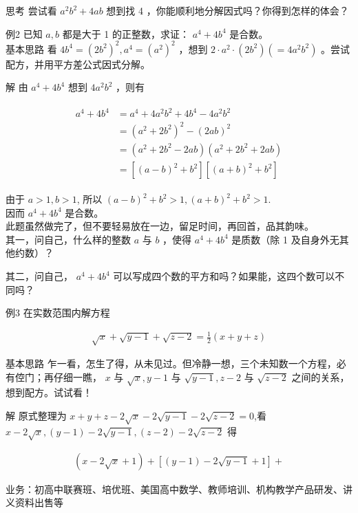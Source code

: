 \documentclass[10pt]{article}
\begin{document}
思考 尝试看 $a^{2} b^{2}+4 a b$ 想到找 4 ，你能顺利地分解因式吗？你得到怎样的体会？

例2 已知 $a, b$ 都是大于 1 的正整数，求证： $a^{4}+4 b^{4}$ 是合数。\\
基本思路 看 $4 b^{4}=\left(2 b^{2}\right)^{2}, a^{4}=\left(a^{2}\right)^{2}$ ，想到 $2 \cdot a^{2} \cdot\left(2 b^{2}\right)\left(=4 a^{2} b^{2}\right)$ 。尝试配方，并用平方差公式因式分解。

解 由 $a^{4}+4 b^{4}$ 想到 $4 a^{2} b^{2}$ ，则有

\begin{align*}
\begin{aligned}
a^{4}+4 b^{4} & =a^{4}+4 a^{2} b^{2}+4 b^{4}-4 a^{2} b^{2} \\
& =\left(a^{2}+2 b^{2}\right)^{2}-(2 a b)^{2} \\
& =\left(a^{2}+2 b^{2}-2 a b\right)\left(a^{2}+2 b^{2}+2 a b\right) \\
& =\left[(a-b)^{2}+b^{2}\right]\left[(a+b)^{2}+b^{2}\right]
\end{aligned}
\end{align*}

由于 $a>1, b>1$, 所以 $(a-b)^{2}+b^{2}>1,(a+b)^{2}+b^{2}>1$.\\
因而 $a^{4}+4 b^{4}$ 是合数。\\
此题虽然做完了，但不要轻易放在一边，留足时间，再回首，品其韵味。\\
其一，问自己，什么样的整数 $a$ 与 $b$ ，使得 $a^{4}+4 b^{4}$ 是质数（除 1 及自身外无其他约数）？

其二，问自己， $a^{4}+4 b^{4}$ 可以写成四个数的平方和吗？如果能，这四个数可以不同吗？

例3 在实数范围内解方程

\begin{align*}
\sqrt{x}+\sqrt{y-1}+\sqrt{z-2}=\frac{1}{2}(x+y+z)
\end{align*}

基本思路 乍一看，怎生了得，从未见过。但冷静一想，三个未知数一个方程，必有倥门；再仔细一瞧， $x$ 与 $\sqrt{x}, y-1$ 与 $\sqrt{y-1}, z-2$ 与 $\sqrt{z-2}$ 之间的关系，想到配方。试试看！

解 原式整理为 $x+y+z-2 \sqrt{x}-2 \sqrt{y-1}-2 \sqrt{z-2}=0$,看 $x-2 \sqrt{x},(y-1)-2 \sqrt{y-1},(z-2)-2 \sqrt{z-2}$ 得

\begin{align*}
(x-2 \sqrt{x}+1)+[(y-1)-2 \sqrt{y-1}+1]+
\end{align*}

业务：初高中联赛班、培优班、美国高中数学、教师培训、机构教学产品研发、讲义资料出售等
\end{document}

